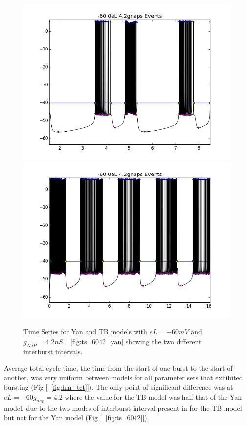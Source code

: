 \documentclass[11pt]{article}
\begin{document}
\begin{figure}
	\centering
		{\includegraphics[scale=0.4]{time_ser_tb_-60p0eL_4p2gnaps.png}}%
		{\includegraphics[scale=.4]{yan_-60p0eL_4p2gnapstime_series.png}}
	\caption{Time Series for Yan and TB models with $eL=-60 mV$ and $g_{NaP}=4.2 nS$. ~\ref{fig:ts_6042_yan} showing the two different interburst intervals.} \label{ts_6042}
\end{figure}

Average total cycle time, the time from the start of one burst to the start of another, was very uniform between models for all parameter sets that exhibited bursting (Fig [~\ref{fig:hm_tct}]). The only point of significant difference was at $eL=-60 g_{nap} = 4.2$ where the value for the TB model was half that of the Yan model, due to the two modes of interburst interval present in for the TB model but not for the Yan model (Fig [~\ref{fig:ts_6042}]).
\end{document}
